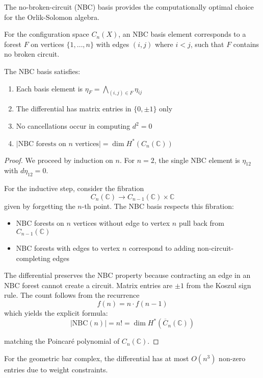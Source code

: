 The no-broken-circuit (NBC) basis provides the computationally optimal choice for the Orlik-Solomon algebra.
 
\begin{definition}
For the configuration space $C_n(X)$, an NBC basis element corresponds to a forest $F$ on vertices $\{1,\ldots,n\}$ with edges $(i,j)$ where $i < j$, such that $F$ contains no broken circuit.
\end{definition}
 
\begin{theorem}
The NBC basis satisfies:
\begin{enumerate}
\item Each basis element is $\eta_F = \bigwedge_{(i,j) \in F} \eta_{ij}$
\item The differential has matrix entries in $\{0, \pm 1\}$ only
\item No cancellations occur in computing $d^2 = 0$
\item $|\text{NBC forests on $n$ vertices}| = \dim H^*(C_n(\mathbb{C}))$
\end{enumerate}
\end{theorem}

\begin{proof}
We proceed by induction on $n$. For $n = 2$, the single NBC element is $\eta_{12}$ with $d\eta_{12} = 0$.
 
For the inductive step, consider the fibration
\[
C_n(\mathbb{C}) \to C_{n-1}(\mathbb{C}) \times \mathbb{C}
\]
given by forgetting the $n$-th point. The NBC basis respects this fibration:
\begin{itemize}
\item NBC forests on $n$ vertices without edge to vertex $n$ pull back from $C_{n-1}(\mathbb{C})$
\item NBC forests with edges to vertex $n$ correspond to adding non-circuit-completing edges
\end{itemize}
 
The differential preserves the NBC property because contracting an edge in an NBC forest cannot create a circuit. Matrix entries are $\pm 1$ from the Koszul sign rule. The count follows from the recurrence
\[
f(n) = n \cdot f(n-1)
\]
which yields the explicit formula:
\[
|\text{NBC}(n)| = n! = \dim H^*(\overline{C}_n(\mathbb{C}))
\]

matching the Poincaré polynomial of $C_n(\mathbb{C})$.
\end{proof}

\begin{proposition}\label{prop:nbc-sparsity}
For the geometric bar complex, the differential has at most $O(n^3)$ non-zero entries due to weight constraints.
\end{proposition}

